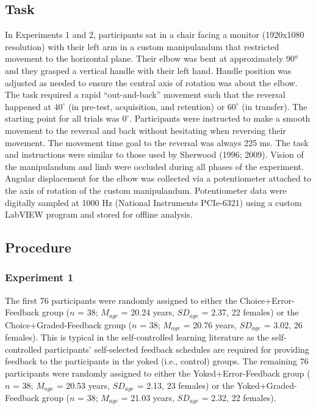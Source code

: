\documentclass[
  doc, donotrepeattitle,floatsintext]{apa7}
\begin{document}
\hypertarget{task}{%
\subsection{Task}\label{task}}

In Experiments 1 and 2, participants sat in a chair facing a monitor (1920x1080 resolution) with their left arm in a custom manipulandum that restricted movement to the horizontal plane. Their elbow was bent at approximately 90° and they grasped a vertical handle with their left hand. Handle position was adjusted as needed to ensure the central axis of rotation was about the elbow. The task required a rapid ``out-and-back'' movement such that the reversal happened at \(40^\circ\) (in pre-test, acquisition, and retention) or \(60^\circ\) (in transfer). The starting point for all trials was \(0^\circ\). Participants were instructed to make a smooth movement to the reversal and back without hesitating when reversing their movement. The movement time goal to the reversal was always 225 ms. The task and instructions were similar to those used by Sherwood (1996; 2009). Vision of the manipulandum and limb were occluded during all phases of the experiment. Angular displacement for the elbow was collected via a potentiometer attached to the axis of rotation of the custom manipulandum. Potentiometer data were digitally sampled at 1000 Hz (National Instruments PCIe-6321) using a custom LabVIEW program and stored for offline analysis.

\hypertarget{procedure}{%
\subsection{Procedure}\label{procedure}}

\hypertarget{experiment-1-1}{%
\subsubsection{Experiment 1}\label{experiment-1-1}}

The first 76 participants were randomly assigned to either the Choice+Error-Feedback group (\(n\) = 38; \(M_{age}\) = 20.24 years, \(SD_{age}\) = 2.37, 22 females) or the Choice+Graded-Feedback group (\(n\) = 38; \(M_{age}\) = 20.76 years, \(SD_{age}\) = 3.02, 26 females). This is typical in the self-controlled learning literature as the self-controlled participants' self-selected feedback schedules are required for providing feedback to the participants in the yoked (i.e., control) groups. The remaining 76 participants were randomly assigned to either the Yoked+Error-Feedback group (\(n\) = 38; \(M_{age}\) = 20.53 years, \(SD_{age}\) = 2.13, 23 females) or the Yoked+Graded-Feedback group (\(n\) = 38; \(M_{age}\) = 21.03 years, \(SD_{age}\) = 2.32, 22 females).
\end{document}
